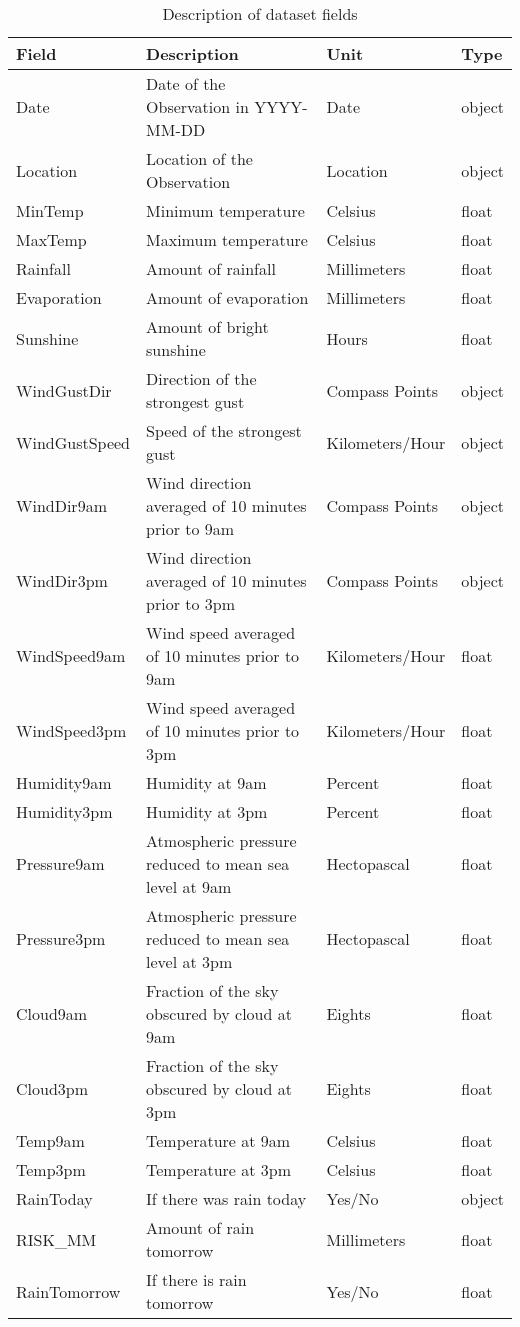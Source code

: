 \documentclass[12pt]{article}
\begin{document}
\begin{table}[H]
\centering
\small
\renewcommand{\arraystretch}{1.2}
\begin{tabular}{| l | p{7cm} | l | l |}
\hline
\textbf{Field} & \textbf{Description} & \textbf{Unit} & \textbf{Type} \\
\hline
Date & Date of the Observation in YYYY-MM-DD & Date & object \\
Location & Location of the Observation & Location & object \\
MinTemp & Minimum temperature & Celsius & float \\
MaxTemp & Maximum temperature & Celsius & float \\
Rainfall & Amount of rainfall & Millimeters & float \\
Evaporation & Amount of evaporation & Millimeters & float \\
Sunshine & Amount of bright sunshine & Hours & float \\
WindGustDir & Direction of the strongest gust & Compass Points & object \\
WindGustSpeed & Speed of the strongest gust & Kilometers/Hour & object \\
WindDir9am & Wind direction averaged of 10 minutes prior to 9am & Compass Points & object \\
WindDir3pm & Wind direction averaged of 10 minutes prior to 3pm & Compass Points & object \\
WindSpeed9am & Wind speed averaged of 10 minutes prior to 9am & Kilometers/Hour & float \\
WindSpeed3pm & Wind speed averaged of 10 minutes prior to 3pm & Kilometers/Hour & float \\
Humidity9am & Humidity at 9am & Percent & float \\
Humidity3pm & Humidity at 3pm & Percent & float \\
Pressure9am & Atmospheric pressure reduced to mean sea level at 9am & Hectopascal & float \\
Pressure3pm & Atmospheric pressure reduced to mean sea level at 3pm & Hectopascal & float \\
Cloud9am & Fraction of the sky obscured by cloud at 9am & Eights & float \\
Cloud3pm & Fraction of the sky obscured by cloud at 3pm & Eights & float \\
Temp9am & Temperature at 9am & Celsius & float \\
Temp3pm & Temperature at 3pm & Celsius & float \\
RainToday & If there was rain today & Yes/No & object \\
RISK\_MM & Amount of rain tomorrow & Millimeters & float \\
RainTomorrow & If there is rain tomorrow & Yes/No & float \\
\hline
\end{tabular}
\caption{Description of dataset fields}
\label{tab:dataset_description}
\end{table}
\newpage
\end{document}
